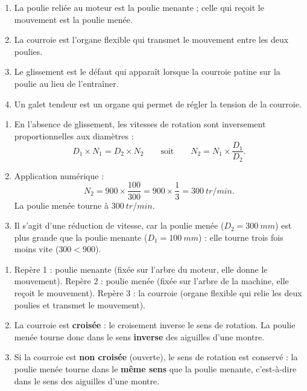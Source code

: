 \documentclass[11pt]{article}
\newcommand{\cle}[1]{{\popxbold\color{popdark}#1}}
\begin{document}
\begin{corrige}
\begin{enumerate}
\item La poulie reliée au moteur est la poulie \cle{menante} ; celle qui reçoit le mouvement est la poulie \cle{menée}.
\item La \cle{courroie} est l'organe flexible qui transmet le mouvement entre les deux poulies.
\item Le \cle{glissement} est le défaut qui apparaît lorsque la courroie patine sur la poulie au lieu de l'entraîner.
\item Un galet \cle{tendeur} est un organe qui permet de régler la tension de la courroie.
\end{enumerate}
\end{corrige}

\begin{corrige}
\begin{enumerate}
\item En l'absence de glissement, les vitesses de rotation sont inversement proportionnelles aux diamètres :
\[ D_1 \times N_1 = D_2 \times N_2 \qquad \text{soit} \qquad N_2 = N_1 \times \frac{D_1}{D_2}. \]
\item Application numérique :
\[ N_2 = 900 \times \frac{100}{300} = 900 \times \frac{1}{3} = \SI{300}{tr/min}. \]
La poulie menée tourne à $\SI{300}{tr/min}$.
\item Il s'agit d'une \cle{réduction} de vitesse, car la poulie menée ($D_2 = \SI{300}{mm}$) est plus grande que la poulie menante ($D_1 = \SI{100}{mm}$) : elle tourne trois fois moins vite ($300 < 900$).
\end{enumerate}
\end{corrige}

\begin{corrige}
\begin{enumerate}
\item Repère 1 : poulie \cle{menante} (fixée sur l'arbre du moteur, elle donne le mouvement). Repère 2 : poulie \cle{menée} (fixée sur l'arbre de la machine, elle reçoit le mouvement). Repère 3 : la \cle{courroie} (organe flexible qui relie les deux poulies et transmet le mouvement).
\item La courroie est \textbf{croisée} : le croisement inverse le sens de rotation. La poulie menée tourne donc dans le sens \textbf{inverse} des aiguilles d'une montre.
\item Si la courroie est \textbf{non croisée} (ouverte), le sens de rotation est conservé : la poulie menée tourne dans le \textbf{même sens} que la poulie menante, c'est-à-dire dans le sens des aiguilles d'une montre.
\end{enumerate}
\end{corrige}
\end{document}
